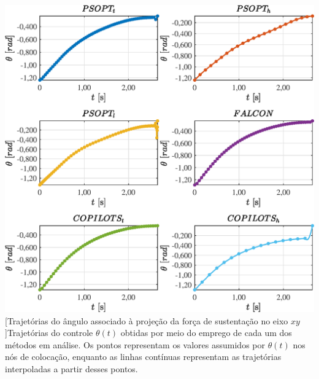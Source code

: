 \noindent
\begin{minipage}{\textwidth}
	\vspace{\onelineskip}
	\centering
	\includegraphics[scale=0.7]{fig/resultados/uav/traj/u/theta}
	[Trajetórias do ângulo associado à projeção da força de sustentação no eixo $xy$]{Trajetórias do controle $ \theta(t) $ obtidas por meio do emprego de cada um dos métodos em análise. Os pontos representam os valores assumidos por $ \theta(t) $ nos nós de colocação, enquanto as linhas contínuas representam as trajetórias interpoladas a partir desses pontos.}
	\label{fig:uav:u:theta}
	\vspace{\onelineskip}
\end{minipage}


